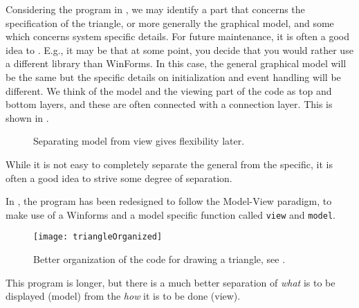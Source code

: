 Considering the program in , we may identify a part that concerns the specification of the triangle, or more generally the graphical model, and some which concerns system specific details. For future maintenance, it is often a good idea to . E.g., it may be that at some point, you decide that you would rather use a different library than WinForms. In this case, the general graphical model will be the same but the specific details on initialization and event handling will be different. We think of the model and the viewing part of the code as top and bottom layers, and these are often connected with a connection layer. This  is shown in .
\begin{figure}
  \centering
  \caption{Separating model from view gives flexibility later.}
  \label{fig:modelView}
\end{figure}
While it is not easy to completely separate the general from the specific, it is often a good idea to strive some degree of separation.

In , the program has been redesigned to follow the Model-View paradigm, to make use of a Winforms and a model specific function called \lstinline{view} and \lstinline{model}.
%
%
\begin{figure}
  \centering
  \texttt{[image: triangleOrganized]}
  \caption{Better organization of the code for drawing a triangle, see .}
  \label{fig:triangleOrganized}
\end{figure}
This program is longer, but there is a much better separation of {\em what} is to be displayed (model) from the {\em how} it is to be done (view).

